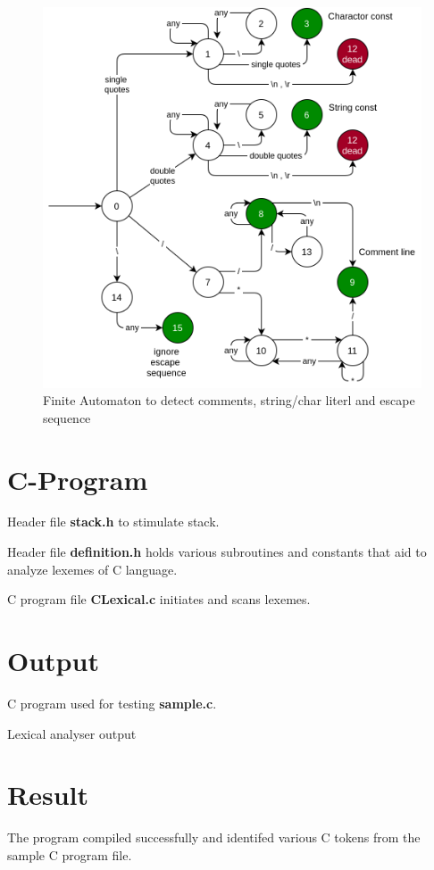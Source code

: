 \begin{figure}[H]
	\centering
	\includegraphics[width=\textwidth]{../EXP1/char-stream.png}
	\caption{Finite Automaton to detect comments, string/char literl and escape sequence}
\end{figure}


\section{C-Program}
Header file \textbf{stack.h} to stimulate stack.


\vspace{0.5cm}
Header file \textbf{definition.h} holds various subroutines and constants that aid to analyze lexemes of C language.


\vspace{0.5cm}
C program file \textbf{CLexical.c} initiates and scans lexemes.



\section{Output}
C program used for testing \textbf{sample.c}.


\vspace{0.5cm}
Lexical analyser output


\section{Result}
The program compiled successfully and identifed various C tokens from the sample C program file.